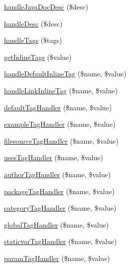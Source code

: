 \begin{DoxyCompactItemize}
\item 
\hyperlink{classphp_documentor_t_parser_ac8d0539cea778bc1ce495b98e3973337}{handle\-Java\-Doc\-Desc} (\$desc)
\item 
\hyperlink{classphp_documentor_t_parser_af7c8dd1dbec9f5a5ab7273e2ac9dac2f}{handle\-Desc} (\$desc)
\item 
\hyperlink{classphp_documentor_t_parser_abb952ee2c4bdbf826958dafe271f6227}{handle\-Tags} (\$tags)
\item 
\hyperlink{classphp_documentor_t_parser_aceabdac609ee2dd583f741625b4f29b1}{get\-Inline\-Tags} (\$value)
\item 
\hyperlink{classphp_documentor_t_parser_a73b963ce376aca18fd8dbebecad18d43}{handle\-Default\-Inline\-Tag} (\$name, \$value)
\item 
\hyperlink{classphp_documentor_t_parser_a59dc0565977e89f086dda024bfafdc78}{handle\-Link\-Inline\-Tag} (\$name, \$value)
\item 
\hyperlink{classphp_documentor_t_parser_ae749c6aebeeb45acbdbb9cfe2bb9491d}{default\-Tag\-Handler} (\$name, \$value)
\item 
\hyperlink{classphp_documentor_t_parser_ad6f71217a68bdd0865485e2a61e948fa}{example\-Tag\-Handler} (\$name, \$value)
\item 
\hyperlink{classphp_documentor_t_parser_a91350e01ffd2ff84e9418df6b59cd725}{filesource\-Tag\-Handler} (\$name, \$value)
\item 
\hyperlink{classphp_documentor_t_parser_a97272150e76106347b3b07bd64ec14d7}{uses\-Tag\-Handler} (\$name, \$value)
\item 
\hyperlink{classphp_documentor_t_parser_a455e7b8c3ca600c20d80d243e231d40b}{author\-Tag\-Handler} (\$name, \$value)
\item 
\hyperlink{classphp_documentor_t_parser_a43c50e62bd8707e94ffb22e293183587}{package\-Tag\-Handler} (\$name, \$value)
\item 
\hyperlink{classphp_documentor_t_parser_a45815724d484d4de5aa99cd245b645be}{category\-Tag\-Handler} (\$name, \$value)
\item 
\hyperlink{classphp_documentor_t_parser_a57e7f87881d9380b76f5cf7744dcc23f}{global\-Tag\-Handler} (\$name, \$value)
\item 
\hyperlink{classphp_documentor_t_parser_a7d4cd9c769f4ee284af7df08a8fc0beb}{staticvar\-Tag\-Handler} (\$name, \$value)
\item 
\hyperlink{classphp_documentor_t_parser_a2cfd5a32b98e1b33c192c0a97240456e}{param\-Tag\-Handler} (\$name, \$value)
\item 

\end{DoxyCompactItemize}
